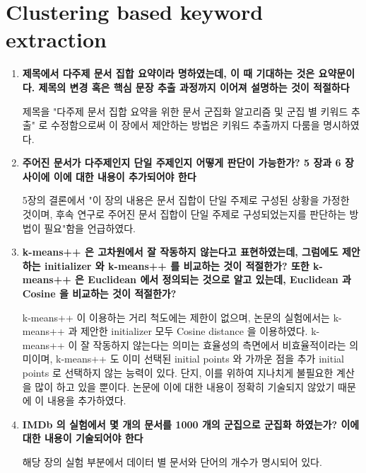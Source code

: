 \documentclass[11pt]{article}
\begin{document}
\section{Clustering based keyword extraction}
\begin{enumerate}
\item \textbf{제목에서 다주제 문서 집합 요약이라 명하였는데, 이 때 기대하는 것은 요약문이다. 제목의 변경 혹은 핵심 문장 추출 과정까지 이어져 설명하는 것이 적절하다}

제목을 "다주제 문서 집합 요약을 위한 문서 군집화 알고리즘 및 군집 별 키워드 추출" 로 수정함으로써 이 장에서 제안하는 방법은 키워드 추출까지 다룸을 명시하였다.

\item \textbf{주어진 문서가 다주제인지 단일 주제인지 어떻게 판단이 가능한가? 5 장과 6 장 사이에 이에 대한 내용이 추가되어야 한다}

5장의 결론에서 "이 장의 내용은 문서 집합이 단일 주제로 구성된 상황을 가정한 것이며, 후속 연구로 주어진 문서 집합이 단일 주제로 구성되었는지를 판단하는 방법이 필요"함을 언급하였다.

\item \textbf{k-means++ 은 고차원에서 잘 작동하지 않는다고 표현하였는데, 그럼에도 제안하는 initializer 와 k-means++ 를 비교하는 것이 적절한가? 또한 k-means++ 은 Euclidean 에서 정의되는 것으로 알고 있는데, Euclidean 과 Cosine 을 비교하는 것이 적절한가?}

k-means++ 이 이용하는 거리 척도에는 제한이 없으며, 논문의 실험에서는 k-means++ 과 제안한 initializer  모두 Cosine distance 을 이용하였다.
k-means++ 이 잘 작동하지 않는다는 의미는 효율성의 측면에서 비효율적이라는 의미이며, k-means++ 도 이미 선택된 initial points 와 가까운 점을 추가 initial points 로 선택하지 않는 능력이 있다.
단지, 이를 위하여 지나치게 불필요한 계산을 많이 하고 있을 뿐이다.
논문에 이에 대한 내용이 정확히 기술되지 않았기 때문에 이 내용을 추가하였다.

\item \textbf{IMDb 의 실험에서 몇 개의 문서를 1000 개의 군집으로 군집화 하였는가? 이에 대한 내용이 기술되어야 한다}

해당 장의 실험 부분에서 데이터 별 문서와 단어의 개수가 명시되어 있다.

\end{enumerate}
\end{document}
